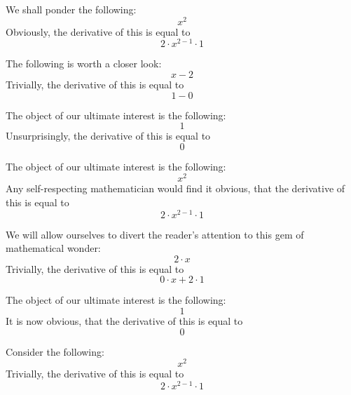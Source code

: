 \documentclass{article}
\begin{document}
We shall ponder the following:
\begin{equation}
x ^{2 } 
\end{equation}
Obviously, the derivative of this is equal to
\begin{equation}
2 \cdot x ^{2 - 1 } \cdot 1 
\end{equation}

The following is worth a closer look:
\begin{equation}
x - 2 
\end{equation}
Trivially, the derivative of this is equal to
\begin{equation}
1 - 0 
\end{equation}

The object of our ultimate interest is the following:
\begin{equation}
1 
\end{equation}
Unsurprisingly, the derivative of this is equal to
\begin{equation}
0 
\end{equation}

The object of our ultimate interest is the following:
\begin{equation}
x ^{2 } 
\end{equation}
Any self-respecting mathematician would find it obvious, that the derivative of this is equal to
\begin{equation}
2 \cdot x ^{2 - 1 } \cdot 1 
\end{equation}

We will allow ourselves to divert the reader's attention to this gem of mathematical wonder:
\begin{equation}
2 \cdot x 
\end{equation}
Trivially, the derivative of this is equal to
\begin{equation}
0 \cdot x + 2 \cdot 1 
\end{equation}

The object of our ultimate interest is the following:
\begin{equation}
1 
\end{equation}
It is now obvious, that the derivative of this is equal to
\begin{equation}
0 
\end{equation}

Consider the following:
\begin{equation}
x ^{2 } 
\end{equation}
Trivially, the derivative of this is equal to
\begin{equation}
2 \cdot x ^{2 - 1 } \cdot 1 
\end{equation}
\end{document}
